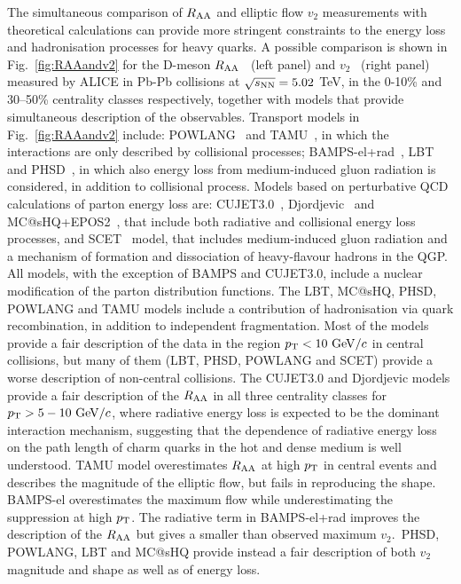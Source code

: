 The simultaneous comparison of $R_{\rm AA}$ and elliptic flow $v_2$ measurements 
with theoretical calculations can provide more stringent constraints to the 
energy loss and hadronisation processes for heavy quarks. 
A possible comparison is shown in Fig.~\ref{fig:RAAandv2} for the 
D-meson $R_{\rm AA}$~\cite{ALICE-PUBLIC-2017-003} (left panel) 
and $v_2$~\cite{Acharya:2017qps} (right panel) measured
by ALICE in Pb-Pb collisions at $\sqrt{s_{\rm NN}} = 5.02$ TeV, in the 0-10\% and 30--50\% 
centrality classes respectively, together with models that 
provide simultaneous description of the observables.
Transport models in Fig.~\ref{fig:RAAandv2} include: 
POWLANG~\cite{Beraudo:2014boa} and TAMU~\cite{He:2014cla}, 
in which the interactions are only described by collisional processes; 
BAMPS-el+rad~\cite{Uphoff:2014hza}, LBT~\cite{Cao:2017hhk} and 
PHSD~\cite{Song:2015ykw}, in which also energy loss from medium-induced gluon radiation
is considered, in addition to collisional process.
Models based on perturbative QCD calculations of parton energy loss 
are: CUJET3.0~\cite{Xu:2015bbz}, Djordjevic~\cite{Djordjevic:2015hra} 
and MC@sHQ+EPOS2~\cite{Nahrgang:2013xaa}, that include both radiative 
and collisional energy loss processes, and SCET~\cite{Kang:2016ofv} model, that includes 
medium-induced gluon radiation and a mechanism of formation and dissociation of 
heavy-flavour hadrons in the QGP. All models, with the exception of BAMPS and CUJET3.0, 
include a nuclear modification of the parton distribution functions.
The LBT, MC@sHQ, PHSD, POWLANG and TAMU
models include a contribution of hadronisation via quark recombination, 
in addition to independent fragmentation. 
Most of the models provide a fair description of the data in the region 
$p_{\rm T}<10~\mathrm{GeV}/c$ in central collisions, 
but many of them (LBT, PHSD, POWLANG and SCET) provide a worse 
description of non-central collisions.
The CUJET3.0 and Djordjevic models provide a fair description of the $R_{\rm AA}$ in all three 
centrality classes for $p_{\rm T} > 5-10~\mathrm{GeV}/c$, where radiative energy loss 
is expected to be the dominant interaction mechanism, suggesting that 
the dependence of radiative energy loss on the path length of charm 
quarks in the hot and dense medium is well understood. 
TAMU model overestimates $R_{\rm AA}$ at high $p_{\rm T}$ in central events and describes 
the magnitude of the elliptic flow, but fails in reproducing the shape.
BAMPS-el overestimates the maximum flow while underestimating the 
suppression at high $p_{\rm T}$. The radiative term in BAMPS-el+rad improves the 
description of the $R_{\rm AA}$ but gives a smaller than observed maximum 
$v_2$.~PHSD, POWLANG, LBT and MC@sHQ provide instead a fair 
description of both $v_2$ magnitude and shape
as well as of energy loss.



